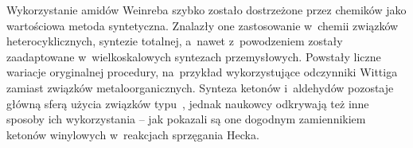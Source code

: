 Wykorzystanie amidów Weinreba szybko zostało dostrzeżone przez chemików jako wartościowa
  metoda syntetyczna.
Znalazły one zastosowanie w~chemii związków heterocyklicznych, syntezie totalnej, a~nawet
  z~powodzeniem zostały zaadaptowane w~wielkoskalowych syntezach przemysłowych.
Powstały liczne wariacje oryginalnej procedury, na~przykład wykorzystujące
  odczynniki Wittiga zamiast związków metaloorganicznych.
Synteza ketonów i~aldehydów pozostaje główną sferą użycia związków typu~,
  jednak naukowcy odkrywają też inne sposoby ich wykorzystania \--- jak pokazali
  \citeauthor{baker13} są one dogodnym zamiennikiem ketonów winylowych w~reakcjach sprzęgania
  Hecka.
